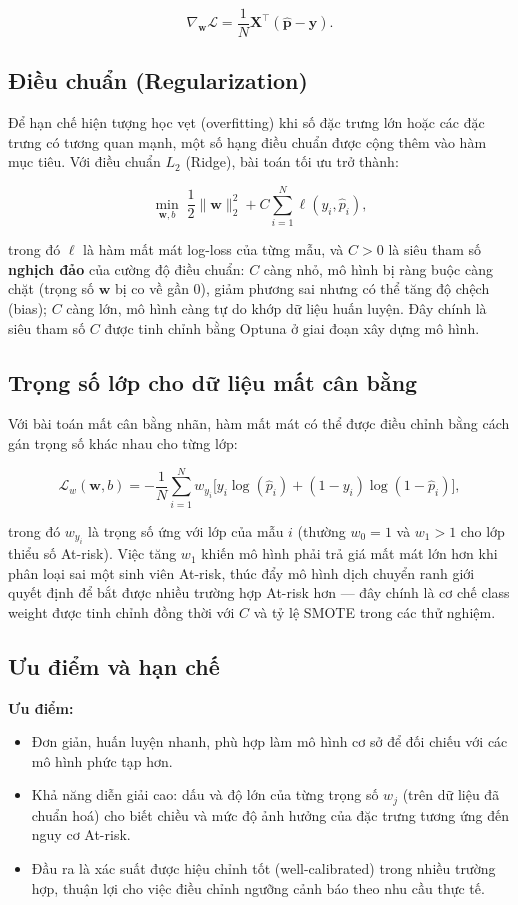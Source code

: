 \documentclass[a4paper]{article}
\newcommand{\code}[1]{{\ttfamily\def\_{\textunderscore\discretionary{}{}{}}#1}}
\def\code#1{#1}%
\def\_{ }%
\begin{document}
\[
  \nabla_{\mathbf{w}} \mathcal{L} = \frac{1}{N} \mathbf{X}^\top
  (\hat{\mathbf{p}} - \mathbf{y}).
\]

\subsection{Điều chuẩn (Regularization)}

Để hạn chế hiện tượng học vẹt (overfitting) khi số đặc trưng lớn hoặc các đặc
trưng có tương quan mạnh, một số hạng điều chuẩn được cộng thêm vào hàm mục
tiêu. Với điều chuẩn $L_2$ (Ridge), bài toán tối ưu trở thành:

\[
  \min_{\mathbf{w}, b} \; \frac{1}{2} \lVert \mathbf{w} \rVert_2^2
  + C \sum_{i=1}^{N} \ell(y_i, \hat{p}_i),
\]

trong đó $\ell$ là hàm mất mát log-loss của từng mẫu, và $C > 0$ là siêu tham
số \textbf{nghịch đảo} của cường độ điều chuẩn: $C$ càng nhỏ, mô hình bị ràng
buộc càng chặt (trọng số $\mathbf{w}$ bị co về gần 0), giảm phương sai nhưng có
thể tăng độ chệch (bias); $C$ càng lớn, mô hình càng tự do khớp dữ liệu huấn
luyện. Đây chính là siêu tham số $C$ được tinh chỉnh bằng Optuna ở giai đoạn
xây dựng mô hình.

\subsection{Trọng số lớp cho dữ liệu mất cân bằng}

Với bài toán mất cân bằng nhãn, hàm mất mát có thể được điều chỉnh bằng cách
gán trọng số khác nhau cho từng lớp:

\[
  \mathcal{L}_w(\mathbf{w}, b) = -\frac{1}{N} \sum_{i=1}^{N} w_{y_i}
  \Big[ y_i \log(\hat{p}_i) + (1 - y_i) \log(1 - \hat{p}_i) \Big],
\]

trong đó $w_{y_i}$ là trọng số ứng với lớp của mẫu $i$ (thường $w_0 = 1$ và
$w_1 > 1$ cho lớp thiểu số At-risk). Việc tăng $w_1$ khiến mô hình phải trả giá
mất mát lớn hơn khi phân loại sai một sinh viên At-risk, thúc đẩy mô hình dịch
chuyển ranh giới quyết định để bắt được nhiều trường hợp At-risk hơn --- đây
chính là cơ chế \code{class\_weight} được tinh chỉnh đồng thời với $C$ và tỷ lệ
SMOTE trong các thử nghiệm.

\subsection{Ưu điểm và hạn chế}

\textbf{Ưu điểm:}
\begin{itemize}[leftmargin=*]
  \item Đơn giản, huấn luyện nhanh, phù hợp làm mô hình cơ sở để đối chiếu với
        các mô hình phức tạp hơn.
  \item Khả năng diễn giải cao: dấu và độ lớn của từng trọng số $w_j$ (trên dữ
        liệu đã chuẩn hoá) cho biết chiều và mức độ ảnh hưởng của đặc trưng
        tương ứng đến nguy cơ At-risk.
  \item Đầu ra là xác suất được hiệu chỉnh tốt (well-calibrated) trong nhiều
        trường hợp, thuận lợi cho việc điều chỉnh ngưỡng cảnh báo theo nhu cầu
        thực tế.
\end{itemize}
\end{document}
